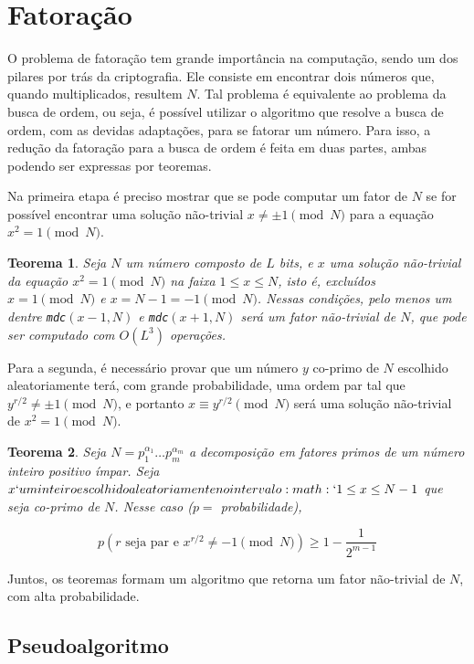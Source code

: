 \section{Fatoração}\label{sec:fatoracao}

O problema de fatoração tem grande importância na computação, sendo um
dos pilares por trás da criptografia.
Ele consiste em encontrar dois números que, quando multiplicados, resultem \(N\).
Tal problema é equivalente ao problema da busca de ordem, ou seja, é possível utilizar
o algoritmo que resolve a busca de ordem, com as devidas adaptações,
para se fatorar um número.
Para isso, a redução da fatoração para a busca de ordem é feita em duas partes, ambas podendo ser expressas por teoremas.

Na primeira etapa é preciso mostrar que se pode computar um fator de
\(N\) se for possível encontrar uma solução não-trivial
\(x \neq \pm 1 \pmod N\) para a equação \(x^2 = 1 \pmod N\).

\newtheorem{theorem}{Teorema}
\begin{theorem}
Seja \(N\) um número composto de \(L\) bits, e \(x\) uma solução
não-trivial da equação \(x^2 = 1 \pmod N\) na faixa \(1 \le x \le N\),
isto é, excluídos \(x = 1 \pmod N\) e \(x = N - 1 = -1 \pmod N\).
Nessas condições, pelo menos um dentre \texttt{mdc}\((x - 1, N)\) e
\texttt{mdc}\((x + 1, N)\) será um fator não-trivial de \(N\), que pode
ser computado com \(O(L^3)\) operações.
\end{theorem}

Para a segunda, é necessário provar que um número \(y\) co-primo de
\(N\) escolhido aleatoriamente terá, com grande probabilidade, uma ordem
par tal que \(y^{r / 2} \neq \pm 1 \pmod N\), e portanto
\(x \equiv y^{r / 2} \pmod N\) será uma solução não-trivial de
\(x^2 = 1 \pmod N\).

\begin{theorem}
Seja \(N = p_1^{\alpha_1} \dots p_m^{\alpha_m}\) a decomposição em
fatores primos de um número inteiro positivo ímpar.
Seja \(x`um inteiro escolhido aleatoriamente no intervalo :math:`1 \le x \le N - 1\)
que seja co-primo de \(N\).
Nesse caso (\(p =\) probabilidade),

\[
  p(r \text{ seja par e } x^{r/2} \neq -1 \pmod N) \ge 1 - \dfrac{1}{2^{m-1}}
\]
\end{theorem}

Juntos, os teoremas formam um algoritmo que retorna um fator não-trivial
de \(N\), com alta probabilidade.

\subsection{Pseudoalgoritmo}\label{subsec:pseudoalgoritmo}

